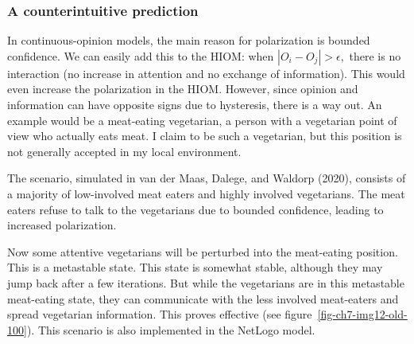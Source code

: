 \documentclass[
  a4paper,
  DIV=11,
  numbers=noendperiod,
  oneside]{scrreprt}
\begin{document}
\subsubsection{A counterintuitive
prediction}\label{sec-A-counterintuitive-prediction}

In continuous-opinion models, the main reason for polarization is
bounded confidence. We can easily add this to the HIOM: when
\(\left| O_{i} - O_{j} \right| > \epsilon,\) there is no interaction (no
increase in attention and no exchange of information). This would even
increase the polarization in the HIOM. However, since opinion and
information can have opposite signs due to hysteresis, there is a way
out. An example would be a meat-eating vegetarian, a person with a
vegetarian point of view who actually eats meat. I claim to be such a
vegetarian, but this position is not generally accepted in my local
environment.

The scenario, simulated in van der Maas, Dalege, and Waldorp (2020),
consists of a majority of low-involved meat eaters and highly involved
vegetarians. The meat eaters refuse to talk to the vegetarians due to
bounded confidence, leading to increased polarization.

Now some attentive vegetarians will be perturbed into the meat-eating
position. This is a metastable state. This state is somewhat stable,
although they may jump back after a few iterations. But while the
vegetarians are in this metastable meat-eating state, they can
communicate with the less involved meat-eaters and spread vegetarian
information. This proves effective (see
figure~\ref{fig-ch7-img12-old-100}). This scenario is also implemented
in the NetLogo model.
\end{document}
